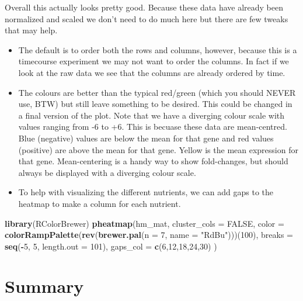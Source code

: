 \documentclass[]{book}
\newenvironment{Shaded}{\begin{snugshade}}{\end{snugshade}}
\newcommand{\DataTypeTok}[1]{\textcolor[rgb]{0.13,0.29,0.53}{#1}}
\newcommand{\DecValTok}[1]{\textcolor[rgb]{0.00,0.00,0.81}{#1}}
\newcommand{\KeywordTok}[1]{\textcolor[rgb]{0.13,0.29,0.53}{\textbf{#1}}}
\newcommand{\NormalTok}[1]{#1}
\newcommand{\OperatorTok}[1]{\textcolor[rgb]{0.81,0.36,0.00}{\textbf{#1}}}
\newcommand{\OtherTok}[1]{\textcolor[rgb]{0.56,0.35,0.01}{#1}}
\newcommand{\StringTok}[1]{\textcolor[rgb]{0.31,0.60,0.02}{#1}}
\providecommand{\tightlist}{%
  \setlength{\itemsep}{0pt}\setlength{\parskip}{0pt}}
\begin{document}
Overall this actually looks pretty good. Because these data have already been normalized and scaled we don't need to do much here but there are few tweaks that may help.

\begin{itemize}
\tightlist
\item
  The default is to order both the rows and columns, however, because this is a timecourse experiment we may not want to order the columns. In fact if we look at the raw data we see that the columns are already ordered by time.
\item
  The colours are better than the typical red/green (which you should NEVER use, BTW) but still leave something to be desired. This could be changed in a final version of the plot. Note that we have a diverging colour scale with values ranging from -6 to +6. This is becuase these data are mean-centred. Blue (negative) values are below the mean for that gene and red values (positive) are above the mean for that gene. Yellow is the mean expression for that gene. Mean-centering is a handy way to show fold-changes, but should always be displayed with a diverging colour scale.
\item
  To help with visualizing the different nutrients, we can add gaps to the heatmap to make a column for each nutrient.
\end{itemize}

\begin{Shaded}
\begin{Highlighting}[]
\KeywordTok{library}\NormalTok{(RColorBrewer)}
\KeywordTok{pheatmap}\NormalTok{(hm_mat,}
         \DataTypeTok{cluster_cols =} \OtherTok{FALSE}\NormalTok{,}
         \DataTypeTok{color =} \KeywordTok{colorRampPalette}\NormalTok{(}\KeywordTok{rev}\NormalTok{(}\KeywordTok{brewer.pal}\NormalTok{(}\DataTypeTok{n =} \DecValTok{7}\NormalTok{, }\DataTypeTok{name =} \StringTok{"RdBu"}\NormalTok{)))(}\DecValTok{100}\NormalTok{),}
         \DataTypeTok{breaks =} \KeywordTok{seq}\NormalTok{(}\OperatorTok{-}\DecValTok{5}\NormalTok{, }\DecValTok{5}\NormalTok{, }\DataTypeTok{length.out =} \DecValTok{101}\NormalTok{),}
         \DataTypeTok{gaps_col =} \KeywordTok{c}\NormalTok{(}\DecValTok{6}\NormalTok{,}\DecValTok{12}\NormalTok{,}\DecValTok{18}\NormalTok{,}\DecValTok{24}\NormalTok{,}\DecValTok{30}\NormalTok{)}
\NormalTok{)}
\end{Highlighting}
\end{Shaded}

\hypertarget{summary}{%
\chapter{Summary}\label{summary}}


\end{document}
